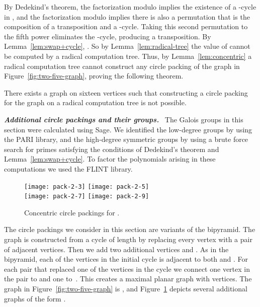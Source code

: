 \documentclass[oribibl,10pt]{llncs}
\newcommand{\Emph}[1]{\smallskip\textbf{\textit{#1}}~}
\newcommand{\nth}[1]{}
\begin{document}
\begin{appendix}
By Dedekind's theorem, the factorization modulo  implies the existence of a -cycle in , and the factorization modulo  implies there is also a permutation that is the composition of a transposition and a -cycle. Taking this second permutation to the fifth power eliminates the -cycle, producing a transposition. By Lemma~\ref{lem:swap+cycle}, . So by Lemma~\ref{lem:radical-tree} the value of  cannot be computed by a radical computation tree. Thus, by Lemma~\ref{lem:concentric}  a radical computation tree cannot construct any circle packing of the graph in Figure~\ref{fig:two-five-graph}, proving the following theorem.

\begin{theorem}
There exists a graph on sixteen vertices such that constructing a circle packing for the graph on a radical computation tree is not possible.
\end{theorem}

\Emph{Additional circle packings and their groups.}\label{app:gallery}
The Galois groups in this section were calculated using Sage. We identified the low-degree groups by using the PARI library, and the high-degree symmetric groups by using a brute force search for primes satisfying the conditions of Dedekind's theorem and Lemma~\ref{lem:swap+cycle}. To factor the polynomials arising in these computations we used the FLINT library.

\begin{figure}[t]
\centering
\texttt{[image: pack-2-3]}\hspace{1em}
\texttt{[image: pack-2-5]}\\
\vspace{1em}
\texttt{[image: pack-2-7]}\hspace{1em}
\texttt{[image: pack-2-9]}
\caption{Concentric circle packings  for .}
\label{fig:pack2n}
\end{figure}

The circle packings we consider in this section are variants of the bipyramid. The graph  is constructed from a cycle of length  by replacing every \nth{n+1} vertex with a pair of adjacent vertices. Then we add two additional vertices  and . As in the bipyramid, each of the vertices in the initial cycle is adjacent to both  and . For each pair that replaced one of the vertices in the cycle we connect one vertex in the pair to  and one to~. This creates a maximal planar graph with  vertices. The graph in Figure~\ref{fig:two-five-graph} is , and Figure~\ref{fig:pack2n} depicts several additional graphs of the form .


\end{appendix}
\end{document}
